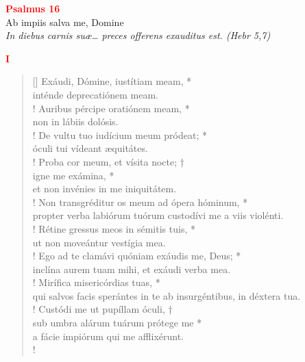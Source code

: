


\def\greinitialformat#1{%
{\fontsize{39}{39}\selectfont #1}%
}




\vspace{0.3cm}
\begin{center}
 \textcolor{red}{\large \bf Psalmus 16}\\
Ab impiis salva me, Domine\\
\textit{\small In diebus carnis suæ… preces offerens exauditus est. (Hebr 5,7)}
\end{center}
\begin{center}
\textcolor{red}{\bf I}
\end{center}
\begin{verse}[\versewidth]
Exáudi, Dómine, iustítiam meam, *\\
inténde deprecatiónem meam.\\!
\vin Auribus pércipe oratiónem meam, *\\
\vin non in lábiis dolósis.\\!
De vultu tuo iudícium meum pródeat; *\\
óculi tui vídeant æquitátes.\\!
\vin Proba cor meum, et vísita nocte; †\\
\vin igne me exámina, *\\
\vin et non invénies in me iniquitátem.\\!
Non transgréditur os meum ad ópera hóminum, *\\
propter verba labiórum tuórum custodívi me a viis violénti.\\!
\vin Rétine gressus meos in sémitis tuis, *\\
\vin ut non moveántur vestígia mea.\\!
Ego ad te clamávi quóniam exáudis me, Deus; *\\
inclína aurem tuam mihi, et exáudi verba mea.\\!
\vin Mirífica misericórdias tuas, *\\
\vin qui salvos facis sperántes in te ab insurgéntibus, in déxtera tua.\\!
Custódi me ut pupíllam óculi, †\\
sub umbra alárum tuárum prótege me *\\
a fácie impiórum qui me afflixérunt.\\!
\end{verse}
